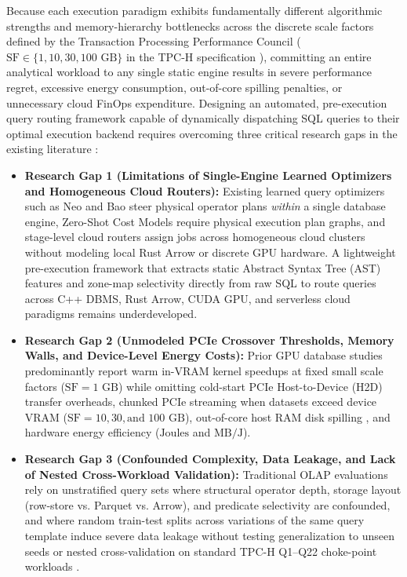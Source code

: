 \documentclass[10pt,a4paper]{article}
\begin{document}
Because each execution paradigm exhibits fundamentally different algorithmic strengths and memory-hierarchy bottlenecks across the discrete scale factors defined by the Transaction Processing Performance Council ($\text{SF} \in \{1, 10, 30, 100\text{ GB}\}$ in the TPC-H specification \cite{tpc2022tpch, boncz2014tpch, dreseler2020quantifying}), committing an entire analytical workload to any single static engine results in severe performance regret, excessive energy consumption, out-of-core spilling penalties, or unnecessary cloud FinOps expenditure. Designing an automated, pre-execution query routing framework capable of dynamically dispatching SQL queries to their optimal execution backend requires overcoming three critical research gaps in the existing literature \cite{ahmed2020hibench, oneil2009ssb, leis2015job}:
\begin{itemize}[leftmargin=1.5em,itemsep=2pt]
    \item \textbf{Research Gap 1 (Limitations of Single-Engine Learned Optimizers and Homogeneous Cloud Routers):} Existing learned query optimizers such as Neo \cite{marcus2019neo} and Bao \cite{marcus2021bao} steer physical operator plans \emph{within} a single database engine, Zero-Shot Cost Models \cite{hilprecht2022zeroshot} require physical execution plan graphs, and stage-level cloud routers \cite{tan2023stage, gupta2023adaptive} assign jobs across homogeneous cloud clusters without modeling local Rust Arrow or discrete GPU hardware. A lightweight pre-execution framework that extracts static Abstract Syntax Tree (AST) features and zone-map selectivity directly from raw SQL to route queries across C++ DBMS, Rust Arrow, CUDA GPU, and serverless cloud paradigms remains underdeveloped.
    \item \textbf{Research Gap 2 (Unmodeled PCIe Crossover Thresholds, Memory Walls, and Device-Level Energy Costs):} Prior GPU database studies \cite{shanbhag2020crystal, root2019mapd, kim2022blazingsql} predominantly report warm in-VRAM kernel speedups at fixed small scale factors ($\text{SF}=1\text{ GB}$) while omitting cold-start PCIe Host-to-Device (H2D) transfer overheads, chunked PCIe streaming when datasets exceed device VRAM ($\text{SF}=10, 30, \text{and } 100\text{ GB}$), out-of-core host RAM disk spilling \cite{kuiper2024duckdb_ooc}, and hardware energy efficiency ($\text{Joules}$ and $\text{MB/J}$).
    \item \textbf{Research Gap 3 (Confounded Complexity, Data Leakage, and Lack of Nested Cross-Workload Validation):} Traditional OLAP evaluations \cite{ahmed2020hibench, abdalla2022bigdata} rely on unstratified query sets where structural operator depth, storage layout (row-store vs. Parquet vs. Arrow), and predicate selectivity are confounded, and where random train-test splits across variations of the same query template induce severe data leakage without testing generalization to unseen seeds or nested cross-validation on standard TPC-H Q1--Q22 choke-point workloads \cite{boncz2014tpch, dreseler2020quantifying}.
\end{itemize}
\end{document}
